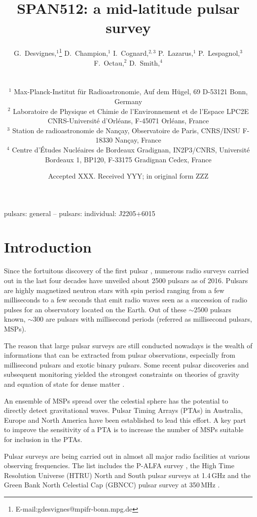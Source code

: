 \documentclass[a4paper,fleqn,usenatbib]{mnras}
\title[SPAN512]{SPAN512: a mid-latitude pulsar survey}
\author[G. Desvignes et al.]{\parbox{\textwidth}{G.~Desvignes,$^{1}$\thanks{E-mail:gdesvignes@mpifr-bonn.mpg.de}
 D.~Champion,$^{1}$
 I.~Cognard,$^{2,3}$
 P.~Lazarus,$^{1}$
 P.~Lespagnol,$^{3}$
 F.~Octau,$^{2}$
 D.~Smith,$^{4}$
 }
\vspace{0.4cm} \\ 
\parbox{\textwidth}{
$^{1}$ Max-Planck-Institut f\"ur Radioastronomie, Auf dem H\"ugel, 69 D-53121 Bonn, Germany\\
$^{2}$ Laboratoire de Physique et Chimie de l'Environnement et de l'Espace LPC2E CNRS-Universit{\'e} d'Orl{\'e}ans, F-45071 Orl{\'e}ans, France\\
$^{3}$ Station de radioastronomie de Nan{\c c}ay, Observatoire de Paris, CNRS/INSU F-18330 Nan{\c c}ay, France\\
$^{4}$ Centre d'\'Etudes Nucl\'eaires de Bordeaux Gradignan, IN2P3/CNRS, Universit\'e Bordeaux 1, BP120, F-33175 Gradignan Cedex, France
}
}
\date{Accepted XXX. Received YYY; in original form ZZZ}
\begin{document}
\label{firstpage}
\pagerange{\pageref{firstpage}--\pageref{lastpage}}
\maketitle

\begin{abstract}

\end{abstract}

\begin{keywords}
pulsars: general -- pulsars: individual: J2205+6015
\end{keywords}

\section{Introduction}

Since the fortuitous discovery of the first pulsar \citep{hbp+68},
numerous radio surveys carried out in the last four decades
have unveiled about 2500 pulsars as of 2016.  Pulsars are highly
magnetized neutron stars with spin period ranging from a few
milliseconds to a few seconds that emit radio waves seen as a
succession of radio pulses for an observatory located on the Earth.
Out of these $\sim 2500$ pulsars known, $\sim 300$ are pulsars with millisecond
periods (referred as millisecond pulsars, MSPs).

The reason that large pulsar surveys are still conducted nowadays is
the wealth of informations that can be extracted from pulsar
observations, especially from millisecond pulsars and exotic binary
pulsars.  Some recent pulsar discoveries and subsequent monitoring
yielded the strongest constraints on theories of gravity \cite[PSR
  J0737$-$3039A/B,][]{ksm+06} and equation of state for dense matter
\citep[][]{af}.

An ensemble of MSPs spread over the celestial sphere has the potential
to directly detect gravitational waves. Pulsar Timing Arrays (PTAs) in
Australia, Europe and North America have been established to lead this
effort. A key part to improve the sensitivity of a PTA is to increase
the number of MSPs suitable for inclusion in the PTAs.

Pulsar surveys are being carried out in almost all major radio
facilities at various observing frequencies. The list includes the
P-ALFA survey \citep{cfl+06,lbh+15}, the High Time Resolution Universe
(HTRU) North \citep{bck+13} and South \citep{kjs+10} pulsar surveys at 1.4\,GHz
and the Green Bank North Celestial Cap (GBNCC) pulsar survey at 350\,MHz \citep{slr+14}.
\end{document}
